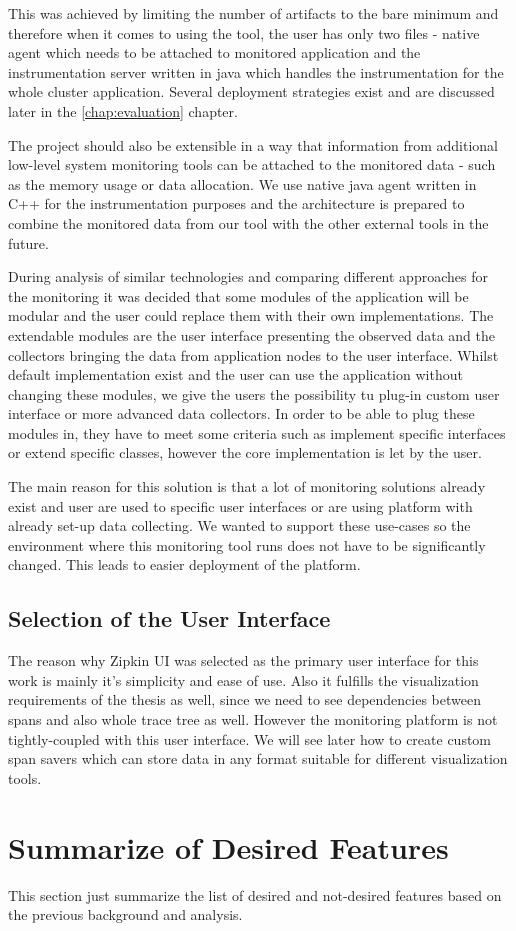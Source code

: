 This was achieved by limiting the number of artifacts to the bare minimum and therefore when it comes to using the tool, the user has only two files - native agent which needs to be attached to monitored application and the instrumentation server written in java which handles the instrumentation for the whole cluster application. Several deployment strategies exist and are discussed later in the \ref{chap:evaluation} chapter.

The project should also be extensible in a way that information from additional low-level system monitoring tools can be attached to the monitored data - such as the memory usage or data allocation. We use native java agent written in C++ for the instrumentation purposes and the architecture is prepared to combine the monitored data from our tool with the other external tools in the future.  

During analysis of similar technologies and comparing different approaches for the monitoring it was decided that some modules of the application will be modular and the user could replace them with their own implementations. The extendable modules are the user interface presenting the observed data and the collectors bringing the data from application nodes to the user interface. Whilst default implementation exist and the user can use the application without changing these modules, we give the users the possibility tu plug-in custom user interface or more advanced data collectors. In order to be able to plug these modules in, they have to meet some criteria such as implement specific interfaces or extend specific classes, however the core implementation is let by the user.

The main reason for this solution is that a lot of monitoring solutions already exist and user are used to specific user interfaces or are using platform with already set-up data collecting. We wanted to support these use-cases so the environment where this monitoring tool runs does not have to be significantly changed. This leads to easier deployment of the platform. 


\subsection{Selection of the User Interface}
The reason why Zipkin UI was selected as the primary user interface for this work is mainly it's simplicity and ease of use. Also it fulfills the visualization requirements of the thesis as well, since we need to see dependencies between spans and also whole trace tree as well. However the monitoring platform is not tightly-coupled with this user interface. We will see later how to create custom span savers which can store data in any format suitable for different visualization tools.


\section{Summarize of Desired Features}
This section just summarize the list of desired and not-desired features based on the previous background and analysis.


